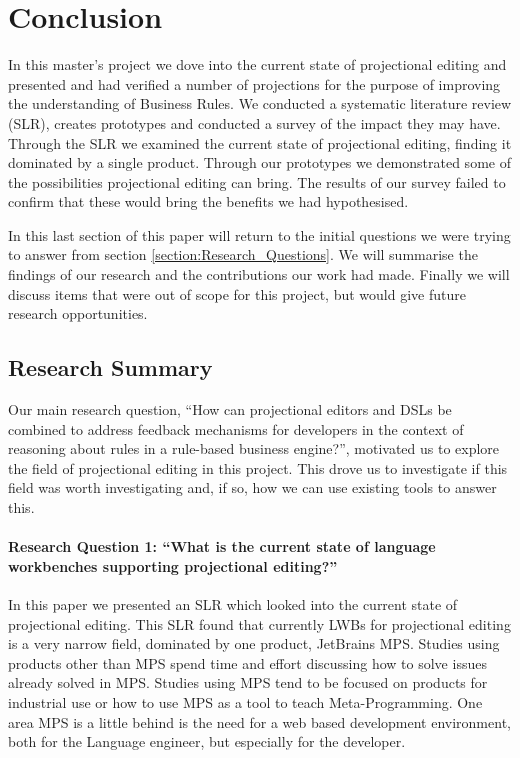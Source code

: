 \chapter{Conclusion}\label{chapter:Conclusion}
In this master's project we dove into the current state of projectional editing and presented and had verified a number of projections for the purpose of improving the understanding of Business Rules.
We conducted a systematic literature review (SLR), creates prototypes and conducted a survey of the impact they may have.
Through the SLR we examined the current state of projectional editing, finding it dominated by a single product.
Through our prototypes we demonstrated some of the possibilities projectional editing can bring.
The results of our survey failed to confirm that these would bring the benefits we had hypothesised.

In this last section of this paper will return to the initial questions we were trying to answer from section \ref{section:Research_Questions}.
We will summarise the findings of our research and the contributions our work had made.
Finally we will discuss items that were out of scope for this project, but would give future research opportunities.


\section{Research Summary}
Our main research question, ``How can projectional editors and DSLs be combined to address feedback mechanisms for developers in the context of reasoning about rules in a rule-based business engine?'', motivated us to explore the field of projectional editing in this project.
This drove us to investigate if this field was worth investigating and, if so, how we can use existing tools to answer this.

\subsubsection{Research Question 1: ``What is the current state of language workbenches supporting projectional editing?''}
In this paper we presented an SLR which looked into the current state of projectional editing.
This SLR found that currently LWBs for projectional editing is a very narrow field, dominated by one product, JetBrains MPS.
Studies using products other than MPS spend time and effort discussing how to solve issues already solved in MPS.
Studies using MPS tend to be focused on products for industrial use or how to use MPS as a tool to teach Meta-Programming.
One area MPS is a little behind is the need for a web based development environment, both for the Language engineer, but especially for the developer.

